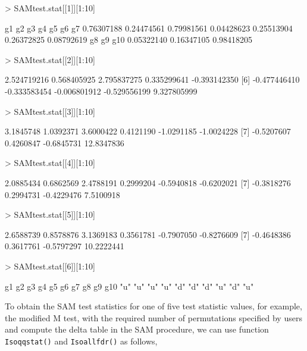 \documentclass[10pt]{mybook4}
\begin{document}
\begin{Schunk}
\begin{Sinput}
> SAMtest.stat[[1]][1:10]
\end{Sinput}
\begin{Soutput}
        g1         g2         g3         g4         g5         g6         g7 
0.76307188 0.24474561 0.79981561 0.04428623 0.25513904 0.26372825 0.08792619 
        g8         g9        g10 
0.05322140 0.16347105 0.98418205 
\end{Soutput}
\begin{Sinput}
> SAMtest.stat[[2]][1:10]
\end{Sinput}
\begin{Soutput}
 [1]  2.524719216  0.568405925  2.795837275  0.335299641 -0.393142350
 [6] -0.477446410 -0.333583454 -0.006801912 -0.529556199  9.327805999
\end{Soutput}
\begin{Sinput}
> SAMtest.stat[[3]][1:10]
\end{Sinput}
\begin{Soutput}
 [1]  3.1845748  1.0392371  3.6000422  0.4121190 -1.0291185 -1.0024228
 [7] -0.5207607  0.4260847 -0.6845731 12.8347836
\end{Soutput}
\begin{Sinput}
> SAMtest.stat[[4]][1:10]
\end{Sinput}
\begin{Soutput}
 [1]  2.0885434  0.6862569  2.4788191  0.2999204 -0.5940818 -0.6202021
 [7] -0.3818276  0.2994731 -0.4229476  7.5100918
\end{Soutput}
\begin{Sinput}
> SAMtest.stat[[5]][1:10]
\end{Sinput}
\begin{Soutput}
 [1]  2.6588739  0.8578876  3.1369183  0.3561781 -0.7907050 -0.8276609
 [7] -0.4648386  0.3617761 -0.5797297 10.2222441
\end{Soutput}
\begin{Sinput}
> SAMtest.stat[[6]][1:10]
\end{Sinput}
\begin{Soutput}
 g1  g2  g3  g4  g5  g6  g7  g8  g9 g10 
"u" "u" "u" "u" "d" "d" "d" "u" "d" "u" 
\end{Soutput}
\end{Schunk}


To obtain the SAM test statistics for one of five test statistic values, for example, the modified M test,
with the required number of permutations specified by users and compute the
delta table in the SAM procedure, we can use function \texttt{Isoqqstat()} and \texttt{Isoallfdr()} as follows,
\end{document}

